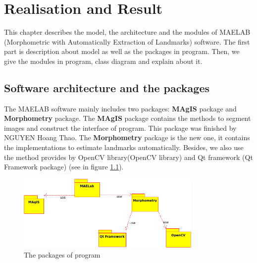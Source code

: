 \chapter{Realisation and Result}
This chapter describes the model, the architecture and the modules of MAELAB (Morphometric with Automatically Extraction of Landmarks) software. The first part is description about model as well as the packages in program. Then, we give the modules in program, class diagram and explain about it.
\section{Software architecture and the packages}
The MAELAB software mainly includes two packages: \textbf{MAgIS} package and \textbf{Morphometry} package. The \textbf{MAgIS} package contains the methods to segment images and construct the interface of program. This package was finished by NGUYEN Hoang Thao. The \textbf{Morphometry} package is the new one, it contains the implementations to estimate landmarks automatically. Besides, we also use the method provides by OpenCV library(OpenCV library) and Qt framework (Qt Framework package) (see in figure \ref{fig:42}).
\begin{figure}[h!]
\centering
\includegraphics[width=0.8\textwidth]{./images/packages}
\caption{The packages of program}
\label{fig:42}
\end{figure}~\\

